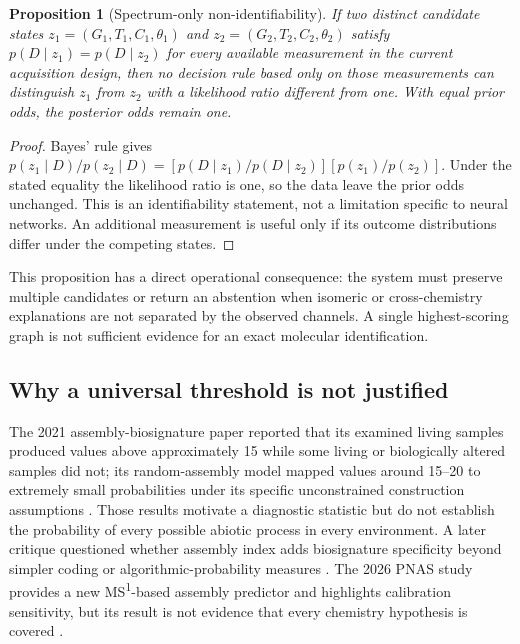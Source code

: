 \documentclass[10pt,a4paper]{article}
\newtheorem{proposition}{Proposition}
\begin{document}
\begin{proposition}[Spectrum-only non-identifiability]
If two distinct candidate states $z_1=(G_1,T_1,C_1,\theta_1)$ and $z_2=(G_2,T_2,C_2,\theta_2)$ satisfy $p(D\mid z_1)=p(D\mid z_2)$ for every available measurement in the current acquisition design, then no decision rule based only on those measurements can distinguish $z_1$ from $z_2$ with a likelihood ratio different from one. With equal prior odds, the posterior odds remain one.
\end{proposition}
\begin{proof}
Bayes' rule gives $p(z_1\mid D)/p(z_2\mid D)=[p(D\mid z_1)/p(D\mid z_2)] [p(z_1)/p(z_2)]$. Under the stated equality the likelihood ratio is one, so the data leave the prior odds unchanged. This is an identifiability statement, not a limitation specific to neural networks. An additional measurement is useful only if its outcome distributions differ under the competing states.
\end{proof}

This proposition has a direct operational consequence: the system must preserve multiple candidates or return an abstention when isomeric or cross-chemistry explanations are not separated by the observed channels. A single highest-scoring graph is not sufficient evidence for an exact molecular identification.

\subsection{Why a universal threshold is not justified}
The 2021 assembly-biosignature paper reported that its examined living samples produced values above approximately 15 while some living or biologically altered samples did not; its random-assembly model mapped values around 15--20 to extremely small probabilities under its specific unconstrained construction assumptions \cite{Marshall2021}. Those results motivate a diagnostic statistic but do not establish the probability of every possible abiotic process in every environment. A later critique questioned whether assembly index adds biosignature specificity beyond simpler coding or algorithmic-probability measures \cite{Uthamacumaran2024}. The 2026 PNAS study provides a new MS\textsuperscript{1}-based assembly predictor and highlights calibration sensitivity, but its result is not evidence that every chemistry hypothesis is covered \cite{Rutter2026}.
\end{document}

